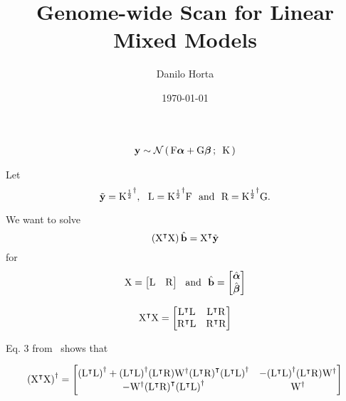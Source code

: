 \documentclass[twocolumn,draft]{article}
\title{Genome-wide Scan for Linear Mixed Models}
\author{Danilo Horta}
\date{\today}
\begin{document}
	\maketitle

\begin{align}
  \mathbf{y} \sim \mathcal{N}\left(\, {\mathrm{F}\boldsymbol{\alpha} + \mathrm{G}\boldsymbol{\beta}} \,;\,~{\mathrm{K}} \,\right)
\end{align}

Let
\begin{equation}
  \tilde{\mathbf{y}} = {\mathrm{K}^{\frac{1}{2}}}^{\dagger},~~ \mathrm{L}
	  = {\mathrm{K}^{\frac{1}{2}}}^{\dagger}\mathrm{F} ~~\text{and}~~ \mathrm{R} = {\mathrm{K}^{\frac{1}{2}}}^{\dagger}\mathrm{G}.
\end{equation}

We want to solve
\begin{equation}
  \left({\mathrm{X}}^\intercal\mathrm{X}\right)\hat{\mathbf{b}} = {\mathrm{X}}^\intercal\tilde{\mathbf{y}}
\end{equation}
for
\begin{equation}
  \mathrm{X} =
    \begin{bmatrix}
      \mathrm{L} & \mathrm{R}
    \end{bmatrix}
  ~~\text{and}~~
  \hat{\mathbf{b}} =
    \begin{bmatrix}
      \hat{\boldsymbol{\alpha}} \\
      \hat{\boldsymbol{\beta}}
    \end{bmatrix}
\end{equation}

\begin{equation}
  {\mathrm{X}}^\intercal\mathrm{X}
    = \begin{bmatrix}
      {\mathrm{L}}^\intercal\mathrm{L} & {\mathrm{L}}^\intercal\mathrm{R} \\
      {\mathrm{R}}^\intercal\mathrm{L} & {\mathrm{R}}^\intercal\mathrm{R}
    \end{bmatrix}
\end{equation}

Eq. 3 from~\cite{rohde1965generalized} shows that

\begin{strip}
	\begin{equation}
		{({\mathrm{X}}^\intercal\mathrm{X})}^{\dagger} =
		\begin{bmatrix}
			{({\mathrm{L}}^\intercal\mathrm{L})}^{\dagger} + {({\mathrm{L}}^\intercal\mathrm{L})}^{\dagger} ({\mathrm{L}}^\intercal\mathrm{R})
				{\mathrm{W}}^{\dagger} {({\mathrm{L}}^\intercal\mathrm{R})}^\intercal {({\mathrm{L}}^\intercal\mathrm{L})}^{\dagger}
				& - {({\mathrm{L}}^\intercal\mathrm{L})}^{\dagger} ({\mathrm{L}}^\intercal\mathrm{R})
				{\mathrm{W}}^{\dagger} \\
			- {\mathrm{W}}^{\dagger} {({\mathrm{L}}^\intercal\mathrm{R})}^\intercal
			{({\mathrm{L}}^\intercal\mathrm{L})}^{\dagger} & {\mathrm{W}}^{\dagger}
		\end{bmatrix}
	\end{equation}
\end{strip}
\end{document}

